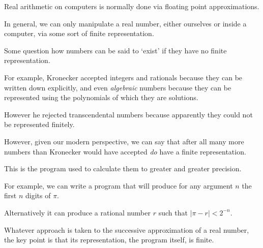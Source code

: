 \begin{slide*}


\vspace*{0.5cm}

Real arithmetic on computers is normally done via floating point
approximations.

In general, we can only manipulate a real number, either ourselves or inside a
computer, via some sort of finite representation.

Some question how numbers can be said to `exist' if they have no finite
representation.

For example, Kronecker accepted integers and rationals because
they can be written down explicitly, and even {\em algebraic}
numbers because they can be represented using the polynomials of which they
are solutions.

However he rejected transcendental numbers because apparently
they could not be represented finitely.

\end{slide*}


\begin{slide*}


\vspace*{0.5cm}

However, given our modern perspective, we can say that after all many more
numbers than Kronecker would have accepted {\em do} have a finite
representation.

This is the program used to calculate them to greater and greater precision.

For example, we can write a program that will produce for any argument {\red
$n$} the first {\red $n$} digits of {\red $\pi$}.

Alternatively it can produce a rational number {\red $r$} such that
{\red $|\pi - r| < 2^{-n}$}.

Whatever approach is taken to the successive approximation of a real number,
the key point is that its representation, the program itself, is finite.

\end{slide*}



